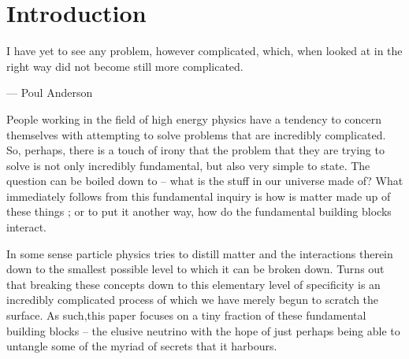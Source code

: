\section{Introduction}

I have yet to see any problem, however complicated, which, when looked at in the right way did not become still more complicated.

\begin{flushright}--- Poul Anderson\end{flushright}

People working in the field of high energy physics have a tendency to concern themselves with attempting to solve problems that are incredibly complicated.
So, perhaps, there is a touch of irony that the problem that they are trying to solve is not only incredibly fundamental, but also very simple to state.
The question can be boiled down to -- what is the stuff in our universe made of?
What immediately follows from this fundamental inquiry is how is matter made up of these things ; or to put it another way, how do the fundamental building blocks interact.

In some sense particle physics tries to distill matter and the interactions therein down to the smallest possible level to which it can be broken down.
Turns out that breaking these concepts down to this elementary level of specificity is an incredibly complicated process of which we have merely begun to scratch the surface.  As such,this paper focuses on a tiny fraction of these fundamental building blocks -- the elusive neutrino with the hope of just perhaps being able to untangle some of the myriad of secrets that it harbours.





























